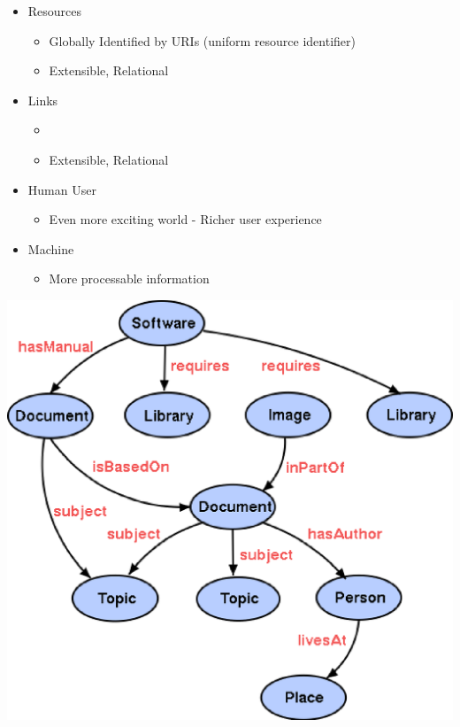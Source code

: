 \documentclass[a4paper,landscape,headrule,footrule,xetex]{foils}
\begin{document}

\begin{itemize}
\item Resources
  \begin{itemize}
  \item Globally Identified by URIs (uniform resource identifier)
  \item Extensible, Relational
  \end{itemize}
\item Links
  \begin{itemize}
  \item {}  \hfill {}
  \item Extensible, Relational
  \end{itemize}
\item Human User
  \begin{itemize}
  \item Even more exciting world - Richer user experience
  \end{itemize}
\item Machine
  \begin{itemize}
  \item More processable information
  \end{itemize}
\end{itemize}
\newpage

\includegraphics[height=\textheight]{../pics/semanticweb.eps}
\end{document}

